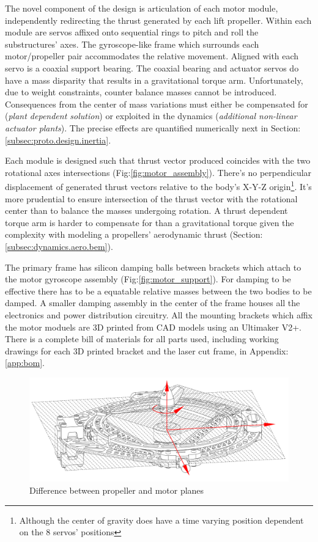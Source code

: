 The novel component of the design is articulation of each motor module, independently redirecting the thrust generated by each lift propeller. Within each module are servos affixed onto sequential rings to pitch and roll the substructures' axes. The gyroscope-like frame which surrounds each motor/propeller pair accommodates the relative movement. Aligned with each servo is a coaxial support bearing. The coaxial bearing and actuator servos do have a mass disparity that results in a gravitational torque arm. Unfortunately, due to weight constraints, counter balance masses cannot be introduced. Consequences from the center of mass variations must either be compensated for (\emph{plant dependent solution}) or exploited in the dynamics (\emph{additional non-linear actuator plants}). The precise effects are quantified numerically next in Section:\ref{subsec:proto.design.inertia}.
\par
Each module is designed such that thrust vector produced coincides with the two rotational axes intersections (Fig:\ref{fig:motor_assembly}). There's no perpendicular displacement of generated thrust vectors relative to the body's X-Y-Z origin\footnote{Although the center of gravity does have a time varying position dependent on the 8 servos' positions}. It's more prudential to ensure intersection of the thrust vector with the rotational center than to balance the masses undergoing rotation. A thrust dependent torque arm is harder to compensate for than a gravitational torque given the complexity with modeling a propellers' aerodynamic thrust (Section:\ref{subsec:dynamics.aero.bem}).
\par
The primary frame has silicon damping balls between brackets which attach to the motor gyroscope assembly (Fig:\ref{fig:motor_support}). For damping to be effective there has to be a equatable relative masses between the two bodies to be damped. A smaller damping assembly in the center of the frame houses all the electronics and power distribution circuitry. All the mounting brackets which affix the motor moduels are 3D printed from CAD models using an Ultimaker V2+\cite{ultimaker}. There is a complete bill of materials for all parts used, including working drawings for each 3D printed bracket and the laser cut frame, in Appendix:\ref{app:bom}.
\par
\begin{figure}[hbtp]
\centering
\includegraphics[width=\textwidth]{figs/motor-prop}
\caption{Difference between propeller and motor planes}
\label{fig:motor_prop}
\end{figure}
